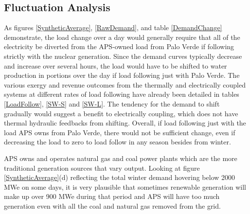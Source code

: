 \subsection{Fluctuation Analysis}
As figures \ref{SyntheticAverage}, \ref{RawDemand}, and table \ref{DemandChange} demonstrate, the load change over a day would generally require that all of the electricity be diverted from the APS-owned load from Palo Verde if following strictly with the nuclear generation.  Since the demand curves typically decrease and increase over several hours, the load would have to be shifted to water production in portions over the day if load following just with Palo Verde.  The various exergy and revenue outcomes from the thermally and electrically coupled systems at different rates of load following have already been detailed in tables \ref{LoadFollow}, \ref{SW-S} and \ref{SW-L}. The tendency for the demand to shift gradually would suggest a benefit to electrically coupling, which does not have thermal hydraulic feedbacks from shifting. Overall, if load following just with the load APS owns from Palo Verde, there would not be sufficient change, even if decreasing the load to zero to load follow in any season besides from winter.

APS owns and operates natural gas and coal power plants which are the more traditional generation sources that vary output. Looking at figure \ref{SyntheticAverage}(d) reflecting the total winter demand hovering below 2000 MWe on some days, it is very plausible that sometimes renewable generation will make up over 900 MWe during that period and APS will have too much generation even with all the coal and natural gas removed from the grid.

